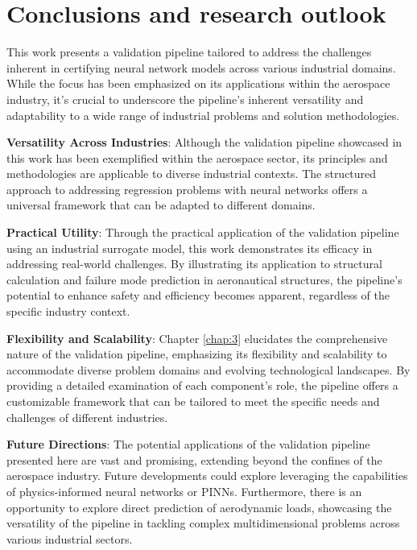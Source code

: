 \chapter{Conclusions and research outlook}

This work presents a validation pipeline tailored to address the challenges inherent in certifying neural network models across various industrial domains. While the focus has been emphasized on its applications within the aerospace industry, it's crucial to underscore the pipeline's inherent versatility and adaptability to a wide range of industrial problems and solution methodologies.

\textbf{Versatility Across Industries}: Although the validation pipeline showcased in this work has been exemplified within the aerospace sector, its principles and methodologies are applicable to diverse industrial contexts. The structured approach to addressing regression problems with neural networks offers a universal framework that can be adapted to different domains.

\textbf{Practical Utility}: Through the practical application of the validation pipeline using an industrial surrogate model, this work demonstrates its efficacy in addressing real-world challenges. By illustrating its application to structural calculation and failure mode prediction in aeronautical structures, the pipeline's potential to enhance safety and efficiency becomes apparent, regardless of the specific industry context.

\textbf{Flexibility and Scalability}: Chapter \ref{chap:3} elucidates the comprehensive nature of the validation pipeline, emphasizing its flexibility and scalability to accommodate diverse problem domains and evolving technological landscapes. By providing a detailed examination of each component's role, the pipeline offers a customizable framework that can be tailored to meet the specific needs and challenges of different industries.

\textbf{Future Directions}: The potential applications of the validation pipeline presented here are vast and promising, extending beyond the confines of the aerospace industry. Future developments could explore leveraging the capabilities of physics-informed neural networks or PINNs\cite{raissi2019deep}. Furthermore, there is an opportunity to explore direct prediction of aerodynamic loads, showcasing the versatility of the pipeline in tackling complex multidimensional problems across various industrial sectors.

